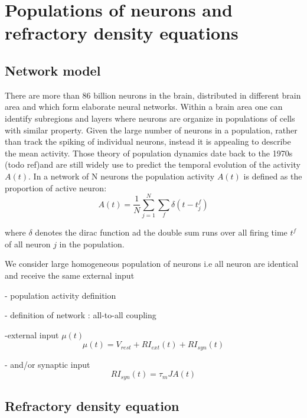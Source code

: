 \documentclass[12pt,twoside]{report}
\begin{document}
\section{Populations of neurons and refractory density equations}

\subsection{Network model}

There are more than 86 billion neurons in the brain, distributed in different brain area and which form elaborate neural networks. Within a brain area one can identify subregions and layers where neurons are organize in populations of cells with similar property. Given the large number of neurons in a population, rather than track the spiking of individual neurons, instead it is appealing to describe the mean activity. 
Those theory of population dynamics date back to the 1970s (todo ref)and are still widely use to predict the temporal evolution of the activity $A(t)$. In a network of N neurons the population activity $A(t)$ is defined as the proportion of active neuron:
\begin{equation}
A(t)=\frac{1}{N}\sum_{j=1}^N\sum_f\delta(t-t_j^f)
\end{equation}

where $\delta$ denotes the dirac function ad the double sum runs over all firing time $t^f$ of all neuron $j$ in the population.

We consider large homogeneous population of neurons i.e all neuron are identical and receive the same external input






- population activity definition

- definition of network : all-to-all coupling

-external input $\mu(t)$
\begin{equation}
\label{eq:mu}
\mu(t)=V_{rest}+RI_{ext}(t)+RI_{syn}(t)
\end{equation}

- and/or synaptic input
\begin{equation}
\label{eq:input}
RI_{syn}(t)=\tau_mJA(t)
\end{equation}

\subsection{Refractory density equation}
\end{document}

